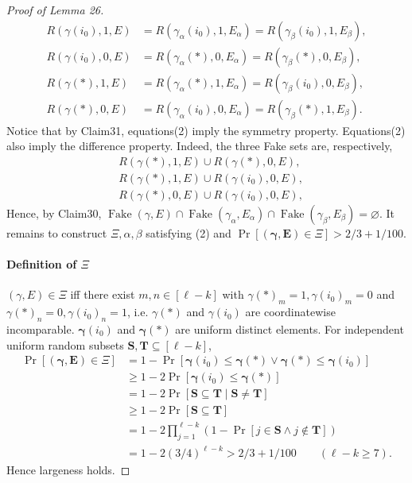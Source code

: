 \begin{proof}[Proof of Lemma 26]
\begin{equation}
\begin{aligned}
R(\gamma(i_0),1,E)&=R(\gamma_\alpha(i_0),1,E_\alpha)=R(\gamma_\beta(i_0),1,E_\beta),\\
R(\gamma(i_0),0,E)&=R(\gamma_\alpha(*),0,E_\alpha)=R(\gamma_\beta(*),0,E_\beta),\\
R(\gamma(*),1,E)&=R(\gamma_\alpha(*),1,E_\alpha)=R(\gamma_\beta(i_0),0,E_\beta),\\
R(\gamma(*),0,E)&=R(\gamma_\alpha(i_0),0,E_\alpha)=R(\gamma_\beta(*),1,E_\beta).
\end{aligned}\tag{2}
\end{equation}
Notice that by Claim31, equations(2) imply the symmetry property. Equations(2) also imply the difference property. Indeed, the three Fake sets are, respectively,
\begin{align*}
& R(\gamma(*),1,E)\cup R(\gamma(*),0,E),\\
& R(\gamma(*),1,E)\cup R(\gamma(i_0),0,E),\\
& R(\gamma(*),0,E)\cup R(\gamma(i_0),0,E),
\end{align*}
Hence, by Claim30, $\operatorname{Fake}(\gamma,E)\cap\operatorname{Fake}(\gamma_\alpha,E_\alpha)\cap\operatorname{Fake}(\gamma_\beta,E_\beta)=\varnothing$.
It remains to construct $\Xi,\alpha,\beta$ satisfying (2) and $\Pr[(\boldsymbol\gamma,\mathbf E)\in\Xi]>2/3+1/100$.
\paragraph{Definition of $\Xi$}
$(\gamma,E)\in\Xi$ iff there exist $m,n\in[\ell-k]$ with $\gamma(*)_m=1,\gamma(i_0)_m=0$ and $\gamma(*)_n=0,\gamma(i_0)_n=1$, i.e. $\gamma(*)$ and $\gamma(i_0)$ are coordinatewise incomparable.
$\boldsymbol\gamma(i_0)$ and $\boldsymbol\gamma(*)$ are uniform distinct elements. For independent uniform random subsets $\mathbf S,\mathbf T\subseteq[\ell-k]$,
\begin{align*}
\Pr[(\boldsymbol\gamma,\mathbf E)\in\Xi]
&=1-\Pr[\boldsymbol\gamma(i_0)\le\boldsymbol\gamma(*)\vee\boldsymbol\gamma(*)\le\boldsymbol\gamma(i_0)]\\
&\ge1-2\Pr[\boldsymbol\gamma(i_0)\le\boldsymbol\gamma(*)]\\
&=1-2\Pr[\mathbf S\subseteq\mathbf T\mid\mathbf S\ne\mathbf T]\\
&\ge1-2\Pr[\mathbf S\subseteq\mathbf T]\\
&=1-2\prod_{j=1}^{\ell-k}(1-\Pr[j\in\mathbf S\wedge j\notin\mathbf T])\\
&=1-2(3/4)^{\ell-k}>2/3+1/100\qquad(\ell-k\ge7).
\end{align*}
Hence largeness holds.

\end{proof}
